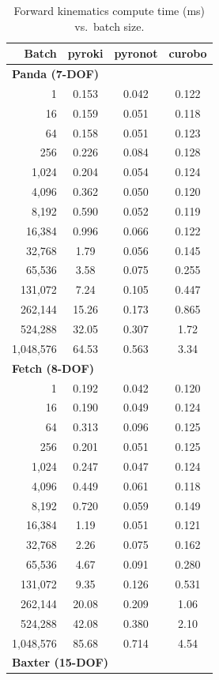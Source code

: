\begin{table}[t]
\centering
\caption{Forward kinematics compute time (ms) vs.\ batch size.}
\label{tab:fk_benchmark}
\small
\begin{tabular}{rccc}
\toprule
Batch & pyroki & pyronot & curobo \\
\midrule
\multicolumn{4}{l}{\textbf{Panda (7-DOF)}} \\
1 & 0.153 & 0.042 & 0.122 \\
16 & 0.159 & 0.051 & 0.118 \\
64 & 0.158 & 0.051 & 0.123 \\
256 & 0.226 & 0.084 & 0.128 \\
1,024 & 0.204 & 0.054 & 0.124 \\
4,096 & 0.362 & 0.050 & 0.120 \\
8,192 & 0.590 & 0.052 & 0.119 \\
16,384 & 0.996 & 0.066 & 0.122 \\
32,768 & 1.79 & 0.056 & 0.145 \\
65,536 & 3.58 & 0.075 & 0.255 \\
131,072 & 7.24 & 0.105 & 0.447 \\
262,144 & 15.26 & 0.173 & 0.865 \\
524,288 & 32.05 & 0.307 & 1.72 \\
1,048,576 & 64.53 & 0.563 & 3.34 \\
\midrule
\multicolumn{4}{l}{\textbf{Fetch (8-DOF)}} \\
1 & 0.192 & 0.042 & 0.120 \\
16 & 0.190 & 0.049 & 0.124 \\
64 & 0.313 & 0.096 & 0.125 \\
256 & 0.201 & 0.051 & 0.125 \\
1,024 & 0.247 & 0.047 & 0.124 \\
4,096 & 0.449 & 0.061 & 0.118 \\
8,192 & 0.720 & 0.059 & 0.149 \\
16,384 & 1.19 & 0.051 & 0.121 \\
32,768 & 2.26 & 0.075 & 0.162 \\
65,536 & 4.67 & 0.091 & 0.280 \\
131,072 & 9.35 & 0.126 & 0.531 \\
262,144 & 20.08 & 0.209 & 1.06 \\
524,288 & 42.08 & 0.380 & 2.10 \\
1,048,576 & 85.68 & 0.714 & 4.54 \\
\midrule
\multicolumn{4}{l}{\textbf{Baxter (15-DOF)}} \\

\end{tabular}
\end{table}
